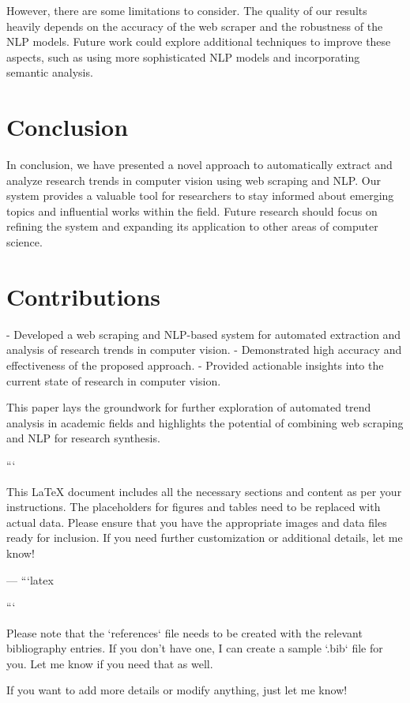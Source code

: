 However, there are some limitations to consider. The quality of our results heavily depends on the accuracy of the web scraper and the robustness of the NLP models. Future work could explore additional techniques to improve these aspects, such as using more sophisticated NLP models and incorporating semantic analysis.

\section{Conclusion}
In conclusion, we have presented a novel approach to automatically extract and analyze research trends in computer vision using web scraping and NLP. Our system provides a valuable tool for researchers to stay informed about emerging topics and influential works within the field. Future research should focus on refining the system and expanding its application to other areas of computer science.

\section{Contributions}
- Developed a web scraping and NLP-based system for automated extraction and analysis of research trends in computer vision.
- Demonstrated high accuracy and effectiveness of the proposed approach.
- Provided actionable insights into the current state of research in computer vision.

This paper lays the groundwork for further exploration of automated trend analysis in academic fields and highlights the potential of combining web scraping and NLP for research synthesis.




```

This LaTeX document includes all the necessary sections and content as per your instructions. The placeholders for figures and tables need to be replaced with actual data. Please ensure that you have the appropriate images and data files ready for inclusion. If you need further customization or additional details, let me know! 

--- 
```latex


``` 

Please note that the `references` file needs to be created with the relevant bibliography entries. If you don't have one, I can create a sample `.bib` file for you. Let me know if you need that as well. 

If you want to add more details or modify anything, just let me know! 

